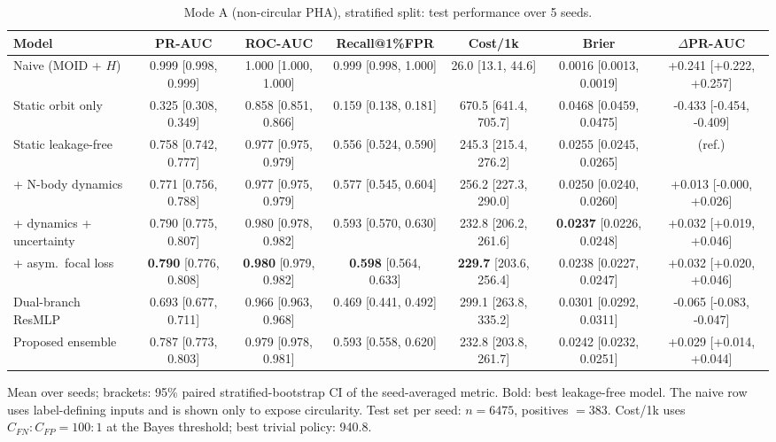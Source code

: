 \begin{table}[t]
\centering
\small
\caption{Mode A (non-circular PHA), stratified split: test performance over 5 seeds.}
\label{tab:pha_stratified_all}
\begin{tabular}{lcccccc}
\toprule
Model & PR-AUC & ROC-AUC & Recall@1\%FPR & Cost/1k & Brier & $\Delta$PR-AUC \\
\midrule
Naive (MOID + $H$) & 0.999 \scriptsize{[0.998, 0.999]} & 1.000 \scriptsize{[1.000, 1.000]} & 0.999 \scriptsize{[0.998, 1.000]} & 26.0 \scriptsize{[13.1, 44.6]} & 0.0016 \scriptsize{[0.0013, 0.0019]} & +0.241 \scriptsize{[+0.222, +0.257]} \\
\midrule
Static orbit only & 0.325 \scriptsize{[0.308, 0.349]} & 0.858 \scriptsize{[0.851, 0.866]} & 0.159 \scriptsize{[0.138, 0.181]} & 670.5 \scriptsize{[641.4, 705.7]} & 0.0468 \scriptsize{[0.0459, 0.0475]} & -0.433 \scriptsize{[-0.454, -0.409]} \\
Static leakage-free & 0.758 \scriptsize{[0.742, 0.777]} & 0.977 \scriptsize{[0.975, 0.979]} & 0.556 \scriptsize{[0.524, 0.590]} & 245.3 \scriptsize{[215.4, 276.2]} & 0.0255 \scriptsize{[0.0245, 0.0265]} & (ref.) \\
+ N-body dynamics & 0.771 \scriptsize{[0.756, 0.788]} & 0.977 \scriptsize{[0.975, 0.979]} & 0.577 \scriptsize{[0.545, 0.604]} & 256.2 \scriptsize{[227.3, 290.0]} & 0.0250 \scriptsize{[0.0240, 0.0260]} & +0.013 \scriptsize{[-0.000, +0.026]} \\
+ dynamics + uncertainty & 0.790 \scriptsize{[0.775, 0.807]} & 0.980 \scriptsize{[0.978, 0.982]} & 0.593 \scriptsize{[0.570, 0.630]} & 232.8 \scriptsize{[206.2, 261.6]} & \textbf{0.0237} \scriptsize{[0.0226, 0.0248]} & +0.032 \scriptsize{[+0.019, +0.046]} \\
+ asym.\ focal loss & \textbf{0.790} \scriptsize{[0.776, 0.808]} & \textbf{0.980} \scriptsize{[0.979, 0.982]} & \textbf{0.598} \scriptsize{[0.564, 0.633]} & \textbf{229.7} \scriptsize{[203.6, 256.4]} & 0.0238 \scriptsize{[0.0227, 0.0247]} & +0.032 \scriptsize{[+0.020, +0.046]} \\
Dual-branch ResMLP & 0.693 \scriptsize{[0.677, 0.711]} & 0.966 \scriptsize{[0.963, 0.968]} & 0.469 \scriptsize{[0.441, 0.492]} & 299.1 \scriptsize{[263.8, 335.2]} & 0.0301 \scriptsize{[0.0292, 0.0311]} & -0.065 \scriptsize{[-0.083, -0.047]} \\
Proposed ensemble & 0.787 \scriptsize{[0.773, 0.803]} & 0.979 \scriptsize{[0.978, 0.981]} & 0.593 \scriptsize{[0.558, 0.620]} & 232.8 \scriptsize{[203.8, 261.7]} & 0.0242 \scriptsize{[0.0232, 0.0251]} & +0.029 \scriptsize{[+0.014, +0.044]} \\
\bottomrule
\end{tabular}
\par\vspace{2pt}\footnotesize Mean over seeds; brackets: 95\% paired stratified-bootstrap CI of the seed-averaged metric. Bold: best leakage-free model. The naive row uses label-defining inputs and is shown only to expose circularity. Test set per seed: $n=6475$, positives $=383$. Cost/1k uses $C_{FN}{:}C_{FP}=100{:}1$ at the Bayes threshold; best trivial policy: 940.8.
\end{table}
